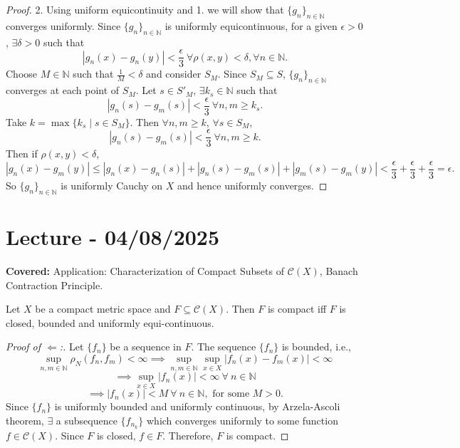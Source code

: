 \documentclass{functionspaces}
\begin{document}
\begin{proof}
2. Using uniform equicontinuity and 1. we will show that $\{g_n\}_{n \in \mathbb{N}}$ converges uniformly. Since $\{g_n\}_{n \in \mathbb{N}}$ is uniformly equicontinuous, for a given $\epsilon > 0$, $\exists \delta > 0$ such that
\[
|g_n(x) - g_n(y)| < \frac{\epsilon}{3} \ \forall \rho(x,y) < \delta, \forall n \in \mathbb{N}.
\]
Choose $M \in \mathbb{N}$ such that $\frac{1}{M} < \delta$ and consider $S_M$. Since $S_M \subseteq S$, $\{g_n\}_{n \in \mathbb{N}}$ converges at each point of $S_M$. Let $s \in S'_M$, $\exists k_s \in \mathbb{N}$ such that
\[
|g_n(s) - g_m(s)| < \frac{\epsilon}{3} \ \forall n,m \geq k_s.
\]
Take $k = \max\{k_s \mid s \in S_M\}$. Then $\forall n,m \geq k$, $\forall s \in S_M$,
\[
|g_n(s) - g_m(s)| < \frac{\epsilon}{3} \ \forall n,m \geq k.
\]
Then if $\rho(x,y) < \delta$,
\[
|g_n(x) - g_m(y)| \leq |g_n(x) - g_n(s)| + |g_n(s) - g_m(s)| + |g_m(s) - g_m(y)| < \frac{\epsilon}{3} + \frac{\epsilon}{3} + \frac{\epsilon}{3} = \epsilon.
\]
So $\{g_n\}_{n \in \mathbb{N}}$ is uniformly Cauchy on $X$ and hence uniformly converges.
\end{proof}

\endgroup


\newpage
\section{Lecture - 04/08/2025}

\textbf{Covered:} Application: Characterization of Compact Subsets of $\mathcal{C}(X)$, Banach Contraction Principle.

\begingroup
\setlength{\parskip}{6pt}
\setlength{\parindent}{0pt}

\begin{theorem}
Let $X$ be a compact metric space and $F \subseteq \mathcal{C}(X)$. Then $F$ is compact iff $F$ is closed, bounded and uniformly equi-continuous.
\end{theorem}

\begin{proof}[Proof of $\Longleftarrow$:]
Let $\{f_{n}\}$ be a sequence in $F$. The sequence $\{f_{n}\}$ is bounded, i.e.,
\[
\sup_{n,m\in\mathbb{N}}\rho_{N}(f_{n},f_{m})<\infty \implies \sup_{n,m\in\mathbb{N}}\sup_{x\in X}|f_{n}(x)-f_{m}(x)|<\infty
\]
\[
\implies \sup_{x\in X}|f_{n}(x)|<\infty\ \forall\ n\in\mathbb{N}
\]
\[
\implies |f_{n}(x)|<M\ \forall\ n\in\mathbb{N},\text{ for some }M>0.
\]
Since $\{f_{n}\}$ is uniformly bounded and uniformly continuous, by Arzela-Ascoli theorem, $\exists$ a subsequence $\{f_{n_{k}}\}$ which converges uniformly to some function $f\in \mathcal{C}(X)$. Since $F$ is closed, $f\in F$. Therefore, $F$ is compact.
\end{proof}
\end{document}
